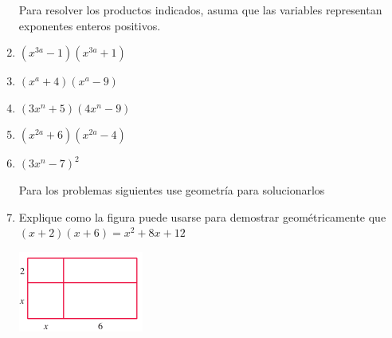 \documentclass[letterpaper,11pt,twoside]{article}
\begin{document}
\begin{multicols}{2}
\begin{enumerate}
 Para resolver los productos indicados, asuma que las variables representan exponentes enteros positivos.
 
 \item $(x^{3a}-1)(x^{3a}+1)$
 \item $(x^{a}+4)(x^{a}-9)$
 \item $(3x^{n}+5)(4x^{n}-9)$
 \item $(x^{2a}+6)(x^{2a}-4)$
 \item $(3x^{n}-7)^{2}$
 
 Para los problemas siguientes use geometría para solucionarlos
 
 \item Explique como la figura puede usarse para demostrar geométricamente que $(x+2)(x+6)=x^{2}+8x+12$
 \begin{center}
 \includegraphics[scale=1]{Images/rectangulo01.png} 
 \end{center}
 \end{enumerate}
\end{multicols}
\end{document}
